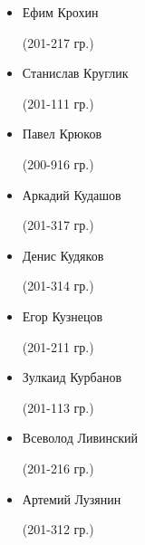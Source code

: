 \begin{multicols}{2}
\begin{small}
\begin{itemize}[leftmargin=0.5em]
	\item[] Ефим Крохин\begin{tiny} (201-217 гр.)\end{tiny} %
	\item[] Станислав Круглик\begin{tiny} (201-111 гр.)\end{tiny}
	\item[] Павел Крюков\begin{tiny} (200-916 гр.)\end{tiny} %
	\item[] Аркадий Кудашов\begin{tiny} (201-317 гр.)\end{tiny} %
	\item[] Денис Кудяков\begin{tiny} (201-314 гр.)\end{tiny} %
	\item[] Егор Кузнецов\begin{tiny} (201-211 гр.)\end{tiny}
	\item[] Зулкаид Курбанов\begin{tiny} (201-113 гр.)\end{tiny}

	\item[] Всеволод Ливинский\begin{tiny} (201-216 гр.)\end{tiny} %
	\item[] Артемий Лузянин\begin{tiny} (201-312 гр.)\end{tiny} %


\end{itemize}
\end{small}
\end{multicols}
